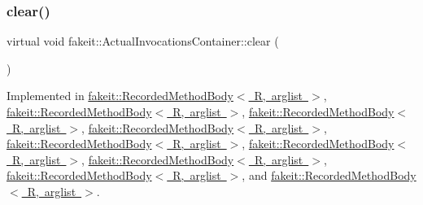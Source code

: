 \mbox{\label{structfakeit_1_1ActualInvocationsContainer_ab0af1e59028b53f8258b713f89bfdcbe}} 
\subsubsection{\texorpdfstring{clear()}{clear()}\hspace{0.1cm}{\footnotesize\ttfamily [2/9]}}
{\footnotesize\ttfamily virtual void fakeit\+::\+Actual\+Invocations\+Container\+::clear (\begin{DoxyParamCaption}{ }\end{DoxyParamCaption})\hspace{0.3cm}{\ttfamily [pure virtual]}}



Implemented in \mbox{\hyperlink{classfakeit_1_1RecordedMethodBody_a6164a16c7813da2b7cd0d46568f1f1bc}{fakeit\+::\+Recorded\+Method\+Body$<$ R, arglist $>$}}, \mbox{\hyperlink{classfakeit_1_1RecordedMethodBody_a6164a16c7813da2b7cd0d46568f1f1bc}{fakeit\+::\+Recorded\+Method\+Body$<$ R, arglist $>$}}, \mbox{\hyperlink{classfakeit_1_1RecordedMethodBody_a6164a16c7813da2b7cd0d46568f1f1bc}{fakeit\+::\+Recorded\+Method\+Body$<$ R, arglist $>$}}, \mbox{\hyperlink{classfakeit_1_1RecordedMethodBody_a6164a16c7813da2b7cd0d46568f1f1bc}{fakeit\+::\+Recorded\+Method\+Body$<$ R, arglist $>$}}, \mbox{\hyperlink{classfakeit_1_1RecordedMethodBody_a6164a16c7813da2b7cd0d46568f1f1bc}{fakeit\+::\+Recorded\+Method\+Body$<$ R, arglist $>$}}, \mbox{\hyperlink{classfakeit_1_1RecordedMethodBody_a6164a16c7813da2b7cd0d46568f1f1bc}{fakeit\+::\+Recorded\+Method\+Body$<$ R, arglist $>$}}, \mbox{\hyperlink{classfakeit_1_1RecordedMethodBody_a6164a16c7813da2b7cd0d46568f1f1bc}{fakeit\+::\+Recorded\+Method\+Body$<$ R, arglist $>$}}, \mbox{\hyperlink{classfakeit_1_1RecordedMethodBody_a6164a16c7813da2b7cd0d46568f1f1bc}{fakeit\+::\+Recorded\+Method\+Body$<$ R, arglist $>$}}, and \mbox{\hyperlink{classfakeit_1_1RecordedMethodBody_a6164a16c7813da2b7cd0d46568f1f1bc}{fakeit\+::\+Recorded\+Method\+Body$<$ R, arglist $>$}}.

\mbox{\label{structfakeit_1_1ActualInvocationsContainer_ab0af1e59028b53f8258b713f89bfdcbe}} 
